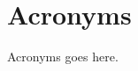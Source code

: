 \chapter*{\centering Acronyms}
\begin{spacing}{1.5}
\setlength{\parskip}{0.3in}
\thispagestyle{addin}

Acronyms goes here.
\end{spacing}
\newpage
